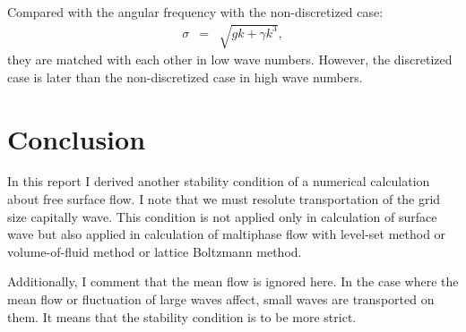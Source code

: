 \documentclass[a4paper,11pt]{article}
\begin{document}
Compared with the angular frequency with the non-discretized case:
\begin{eqnarray}
\sigma &=&\sqrt{gk+\gamma k^3},
\end{eqnarray}
they are matched with each other in low wave numbers.
However, the discretized case is later than the non-discretized case in high wave numbers.

\section{Conclusion}

In this report I derived another stability condition of a numerical
calculation about free surface flow. I note that we must resolute
transportation of the grid size capitally wave. This condition is not
applied only in calculation of surface wave but also applied in
calculation of maltiphase flow with level-set method or volume-of-fluid
method or lattice Boltzmann method.

Additionally, I comment that the mean flow is ignored here.
In the case where the mean flow or fluctuation of large waves affect, small waves are transported on them.
It means that the stability condition is to be more strict.
\end{document}
